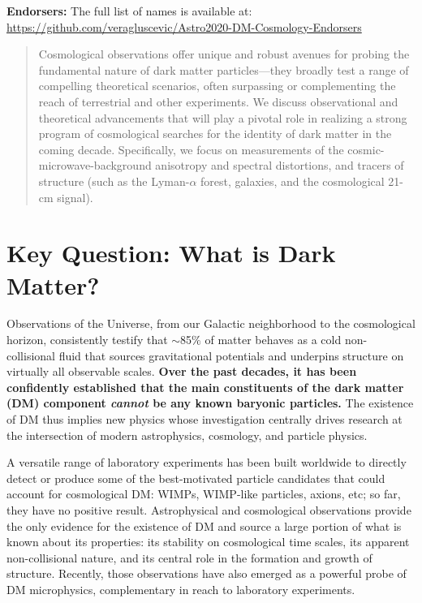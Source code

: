\documentclass[12pt]{article}
\begin{document}
{\small \noindent\textbf{Endorsers:} The full list of names is available at:\\\url{https://github.com/veragluscevic/Astro2020-DM-Cosmology-Endorsers}}
\begin{abstract}
Cosmological observations offer unique and robust avenues for probing the fundamental nature of dark matter particles---they broadly test a range of compelling theoretical scenarios, often surpassing or complementing the reach of terrestrial and other experiments.
We discuss observational and theoretical advancements that will play a pivotal role in realizing a strong program of cosmological searches for the identity of dark matter in the coming decade. Specifically, we focus on measurements of the cosmic-microwave-background anisotropy and spectral distortions, and tracers of structure (such as the Lyman-$\alpha$ forest, galaxies, and the cosmological 21-cm signal).
\end{abstract}

\pagebreak
\section{Key Question: What is Dark Matter?}
 
Observations of the Universe, from our Galactic neighborhood to the cosmological horizon, consistently testify that $\sim$85$\%$ of matter behaves as a cold non-collisional fluid that sources gravitational potentials and underpins structure on virtually all observable scales.
\textbf{Over the past decades, it has been confidently established that the main constituents of the dark matter (DM) component \textit{cannot} be any known baryonic particles.}
The existence of DM thus implies new physics whose investigation centrally drives research at the intersection of modern astrophysics, cosmology, and particle physics. 

A versatile range of laboratory experiments has been built worldwide to directly detect or produce some of the best-motivated particle candidates that could account for cosmological DM: WIMPs, WIMP-like particles, axions, etc; so far, they have no positive result.
Astrophysical and cosmological observations provide the only evidence for the existence of DM and source a large portion of what is known about its properties: its stability on cosmological time scales, its apparent non-collisional nature, and its central role in the formation and growth of structure.
Recently, those observations have also emerged as a powerful probe of DM microphysics, complementary in reach to laboratory experiments.
\end{document}
